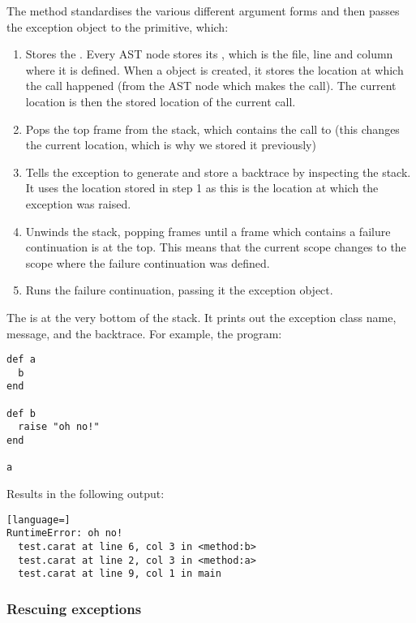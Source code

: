 The  method standardises the various different argument forms and then passes the exception object to the  primitive, which:

\begin{enumerate}
  \item Stores the . Every AST node stores its , which is the file, line and column where it is defined. When a  object is created, it stores the location at which the call happened (from the AST node which makes the call). The current location is then the stored location of the current call.
  
  \item Pops the top frame from the stack, which contains the call to  (this changes the current location, which is why we stored it previously)
  
  \item Tells the exception to generate and store a backtrace by inspecting the stack. It uses the location stored in step 1 as this is the location at which the exception was raised.
  
  \item Unwinds the stack, popping frames until a frame which contains a failure continuation is at the top. This means that the current scope changes to the scope where the failure continuation was defined.
  
  \item Runs the failure continuation, passing it the exception object.
\end{enumerate}

The  is at the very bottom of the stack. It prints out the exception class name, message, and the backtrace. For example, the program:

\begin{lstlisting}
def a
  b
end

def b
  raise "oh no!"
end

a
\end{lstlisting}

Results in the following output:

\begin{lstlisting}[language=]
RuntimeError: oh no!
  test.carat at line 6, col 3 in <method:b>
  test.carat at line 2, col 3 in <method:a>
  test.carat at line 9, col 1 in main
\end{lstlisting}

\subsubsection{Rescuing exceptions}

